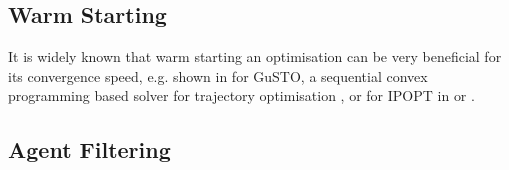\subsection{Warm Starting}
\label{text:approach/runtime/warm_starting}
It is widely known that warm starting an optimisation can be very beneficial for its convergence speed, e.g. shown in \cite{Banerjee2020} for GuSTO, a sequential convex programming based solver for trajectory optimisation \cite{Bonalli2019}, or for \ac{IPOPT} in \cite{John2008} or \cite{Spielberge2019}.


\subsection{Agent Filtering}
\label{text:approach/runtime/filtering}

